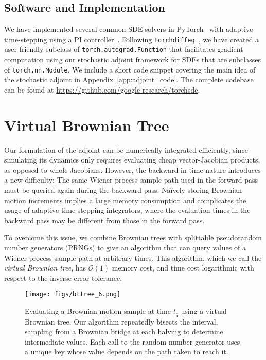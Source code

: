 \documentclass[twoside]{article}
\begin{document}
\subsection{Software and Implementation}
We have implemented several common SDE solvers in PyTorch~\cite{paszke2017automatic} with adaptive time-stepping using a PI controller~\cite{burrage2004adaptive,ilie2015adaptive}. 
Following \texttt{torchdiffeq}~\cite{chen2018neural}, we have created a user-friendly subclass of \texttt{torch.autograd.Function} that facilitates gradient computation using our stochastic adjoint framework for SDEs that are subclasses of \texttt{torch.nn.Module}. 
We include a short code snippet covering the main idea of the stochastic adjoint in Appendix~\ref{app:adjoint_code}.
The complete codebase can be found at \url{https://github.com/google-research/torchsde}.





\section{Virtual Brownian Tree}\label{sec:tree}
Our formulation of the adjoint can be numerically integrated efficiently, since simulating its dynamics only requires evaluating cheap vector-Jacobian products, as opposed to whole Jacobians.
However, the backward-in-time nature introduces a new difficulty:
The same Wiener process sample path used in the forward pass must be queried again during the backward pass.
Na\"ively storing Brownian motion increments 
implies a large memory consumption and complicates the usage of adaptive time-stepping integrators, where the evaluation times in the backward pass may be different from those in the forward pass. 

To overcome this issue, we combine Brownian trees with splittable pseudorandom number generators (PRNGs) to give an algorithm that can query values of a Wiener process sample path at arbitrary times.
This algorithm, which we call the \emph{virtual Brownian tree}, has $\mathcal{O}(1)$ memory cost, and time cost logarithmic with respect to the inverse error tolerance.

\begin{figure}[ht]
{\texttt{[image: figs/bttree\_6.png]}}
\caption{
Evaluating a Brownian motion sample at time $t_q$ using a virtual Brownian tree.
Our algorithm repeatedly bisects the interval, sampling from a Brownian bridge at each halving to determine intermediate values.
Each call to the random number generator uses a unique key whose value depends on the path taken to reach it.
}
\end{figure}
\end{document}
